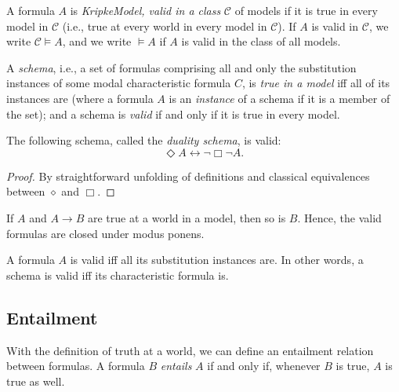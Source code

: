 \begin{definition}
  \label{valid-in-class}
  A formula $A$ is \emph{KripkeModel, valid in a class} $\mathcal{C}$ 
of models if it is true in every model in $\mathcal{C}$ (i.e., true at every 
world in every model in $\mathcal{C}$). If $A$ is valid in $\mathcal{C}$, we 
write $\mathcal{C} \vDash A$, and we write $\vDash A$ if $A$ is valid in the 
class of all models.
\end{definition}

\begin{definition}
  \label{valid-schema}
A \emph{schema}, i.e., a set of formulas comprising all and 
only the substitution instances of some modal characteristic formula $C$, 
is \emph{true in a model} iff all of its instances are 
(where a formula $A$ is an \emph{instance} of a schema if it is a 
member of the set); and a schema is \emph{valid} if and only if it is 
true in every model.
\end{definition}

\begin{proposition}
  \label{duality-schema}
  \leanok
The following schema, called the \emph{duality schema}, is valid:
\[
\Diamond A \leftrightarrow \neg \Box \neg A.
\]
\end{proposition}
\begin{proof}
  \label{proof:duality-schema}
  \leanok
  By straightforward unfolding of definitions and classical equivalences between \(\diamond\) and \(\Box\).
\end{proof}

\begin{proposition}
  \label{modus-ponens-validity}
  If $A$ and $A \rightarrow B$ are true at a world in a model,
  then so is $B$. Hence, the valid formulas are closed under modus ponens.
\end{proposition}

\begin{proposition}
  \label{substitution-validity}
    \leanok
  A formula $A$ is valid iff all its substitution instances are.
  In other words, a schema is valid iff its characteristic formula is.
\end{proposition}

\subsection{Entailment}
With the definition of truth at a world, we can define an entailment
relation between formulas. A formula $B$ \emph{entails} $A$ if and only if, whenever
$B$ is true, $A$ is true as well.

